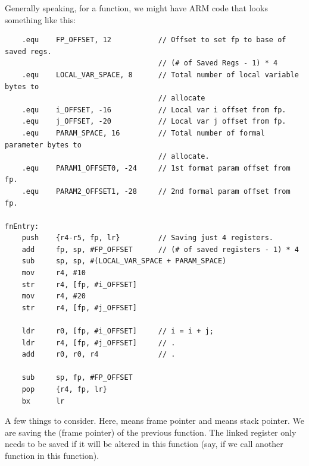 \documentclass[letterpaper]{article}
\begin{document}
Generally speaking, for a function, we might have ARM code that looks something like this:
\begin{verbatim}
    .equ    FP_OFFSET, 12           // Offset to set fp to base of saved regs.
                                    // (# of Saved Regs - 1) * 4 
    .equ    LOCAL_VAR_SPACE, 8      // Total number of local variable bytes to
                                    // allocate
    .equ    i_OFFSET, -16           // Local var i offset from fp. 
    .equ    j_OFFSET, -20           // Local var j offset from fp. 
    .equ    PARAM_SPACE, 16         // Total number of formal parameter bytes to
                                    // allocate. 
    .equ    PARAM1_OFFSET0, -24     // 1st format param offset from fp. 
    .equ    PARAM2_OFFSET1, -28     // 2nd formal param offset from fp. 

fnEntry: 
    push    {r4-r5, fp, lr}         // Saving just 4 registers. 
    add     fp, sp, #FP_OFFSET      // (# of saved registers - 1) * 4
    sub     sp, sp, #(LOCAL_VAR_SPACE + PARAM_SPACE)
    mov     r4, #10
    str     r4, [fp, #i_OFFSET]
    mov     r4, #20 
    str     r4, [fp, #j_OFFSET]

    ldr     r0, [fp, #i_OFFSET]     // i = i + j;
    ldr     r4, [fp, #j_OFFSET]     // .
    add     r0, r0, r4              // .

    sub     sp, fp, #FP_OFFSET
    pop     {r4, fp, lr}
    bx      lr
\end{verbatim}
A few things to consider. Here,  means frame pointer and  means stack pointer. We are saving the  (frame pointer) of the previous function. The linked register only needs to be saved if it will be altered in this function (say, if we call another function in this function). 
\end{document}
